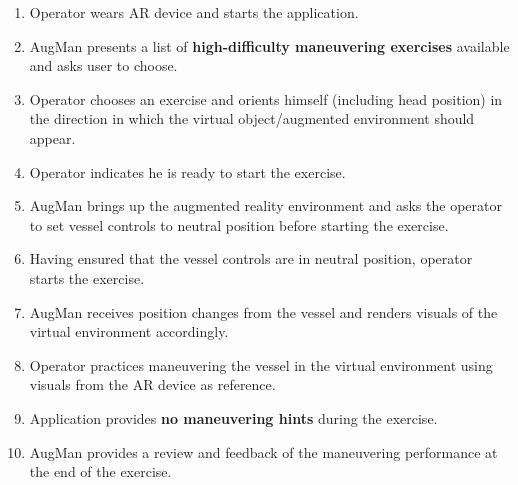 \begin{enumerate}[noitemsep]
	\item Operator wears AR device and starts the application. 
	\item AugMan presents a list of \textbf{high-difficulty maneuvering exercises} available and asks user to choose.
	\item Operator chooses an exercise and orients himself (including head position) in the direction in which the virtual object/augmented environment should appear.
	\item Operator indicates he is ready to start the exercise.
	\item AugMan brings up the augmented reality environment and asks the operator to set vessel controls to neutral position before starting the exercise.
	\item Having ensured that the vessel controls are in neutral position, operator starts the exercise. 
	\item AugMan receives position changes from the vessel and renders visuals of the virtual environment accordingly.
	\item Operator practices maneuvering the vessel in the virtual environment using visuals from the AR device as reference.
	\item Application provides \textbf{no maneuvering hints} during the exercise.
	\item AugMan provides a review and feedback of the maneuvering performance at the end of the exercise.
\end{enumerate}

